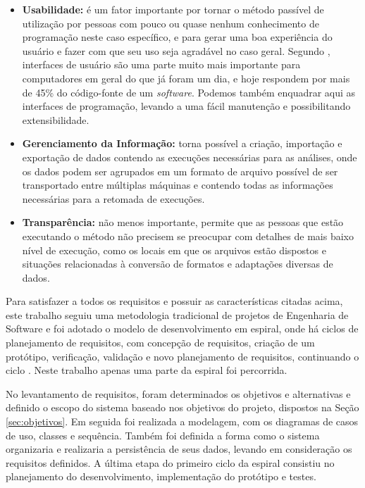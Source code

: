 \begin{itemize}
 \item{\textbf{Usabilidade:} é um fator importante por tornar o método passível de utilização por pessoas com pouco ou quase nenhum conhecimento de
programação neste caso específico, e para gerar uma boa experiência do usuário e fazer com que seu uso seja agradável no caso geral. Segundo
\cite{nielsen1993}, interfaces de usuário são uma parte muito mais importante para computadores em geral do que já foram um dia, e hoje respondem por mais
de 45\% do código-fonte de um \textit{software}. Podemos também enquadrar aqui as interfaces de programação, levando a uma fácil manutenção e possibilitando
extensibilidade.}
  \item{\textbf{Gerenciamento da Informação:} torna possível a criação, importação e exportação de dados contendo as execuções necessárias para as análises,
onde os dados podem ser agrupados em um formato de arquivo possível de ser transportado entre múltiplas máquinas e contendo todas as informações
necessárias para a retomada de execuções.}
  \item{\textbf{Transparência:} não menos importante, permite que as pessoas que estão executando o método não precisem se
preocupar com detalhes de mais baixo nível de execução, como os locais em que os arquivos estão dispostos e situações relacionadas à conversão de
formatos e adaptações diversas de dados.}
\end{itemize}

Para satisfazer a todos os requisitos e possuir as características citadas acima, este trabalho seguiu uma metodologia tradicional de projetos
de Engenharia de Software \cite{softeng2005} e foi adotado o modelo de desenvolvimento em espiral, onde há ciclos de planejamento de requisitos,
com concepção de requisitos, criação
de um protótipo, verificação, validação e novo planejamento de requisitos, continuando o ciclo \cite{boehm1986}. Neste trabalho apenas uma
parte da espiral foi percorrida.

No levantamento de requisitos, foram determinados os objetivos e alternativas e definido o escopo do sistema baseado nos objetivos do projeto,
dispostos na Seção \ref{sec:objetivos}. Em seguida foi realizada a modelagem, com os diagramas de casos de uso, classes e sequência.
Também foi definida a forma como o sistema organizaria e realizaria a persistência de seus dados, levando em consideração os requisitos definidos.
A última etapa do primeiro ciclo da espiral consistiu no planejamento do desenvolvimento, implementação do protótipo e testes.

